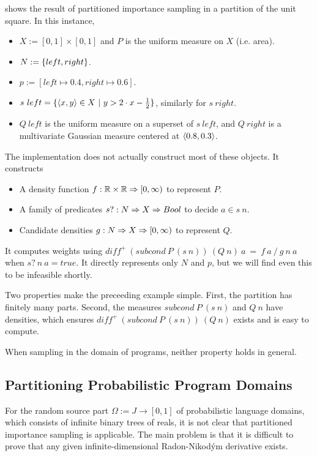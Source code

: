 \begin{example}
 shows the result of partitioned importance sampling in a partition of the unit square.
In this instance,
\begin{itemize}
	\item $X := [0,1] \times [0,1]$ and $P$ is the uniform measure on $X$ (i.e. area).
	\item $N := \{{left,right}\}$.
	\item $p := [left \mapsto 0.4, right \mapsto 0.6]$.
	\item $s~left = \lbrace {\langle{x,y}\rangle \in X} \ \lvert\ {y > 2 \cdot x - \frac{1}{2}} \rbrace$, similarly for $s~right$.
	\item $Q~left$ is the uniform measure on a superset of $s~left$, and $Q~right$ is a multivariate Gaussian measure centered at $\langle{0.8,0.3}\rangle$.
\end{itemize}
The implementation does not actually construct most of these objects. It constructs
\begin{itemize}
	\item A density function $f : \mathbb{R} \times \mathbb{R} \Rightarrow [0,\infty)$ to represent $P$.
	\item A family of predicates $s? : N \Rightarrow X \Rightarrow Bool$ to decide $a \in s~n$.
	\item Candidate densities $g : N \Rightarrow X \Rightarrow [0,\infty)$ to represent $Q$.
\end{itemize}
It computes weights using $diff^+~(subcond~P~(s~n))~(Q~n)~a\ =\ f~a~{/}~g~n~a$ when $s?~n~a = true$.
It directly represents only $N$ and $p$, but we will find even this to be infeasible shortly.
\exampleqed
\end{example}

Two properties make the preceeding example simple.
First, the partition has finitely many parts.
Second, the measures $subcond~P~(s~n)$ and $Q~n$ have densities, which ensures $diff^+~(subcond~P~(s~n))~(Q~n)$ exists and is easy to compute.

When sampling in the domain of programs, neither property holds in general.

\subsection{Partitioning Probabilistic Program Domains}

For the random source part $\Omega := J \to [0,1]$ of probabilistic language domains, which consists of infinite binary trees of reals, it is not clear that partitioned importance sampling is applicable.
The main problem is that it is difficult to prove that any given infinite-dimensional Radon-Nikod\'ym derivative exists.

